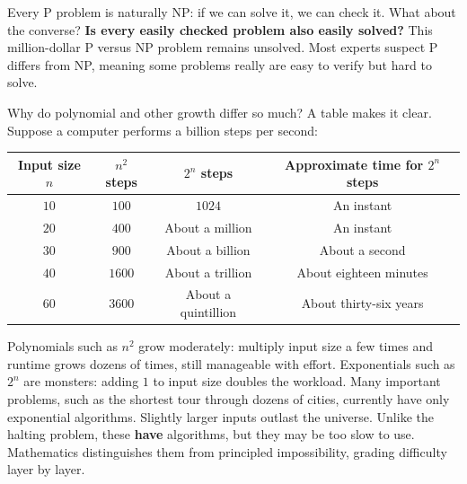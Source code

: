 Every P problem is naturally NP: if we can solve it, we can check it. What about the converse? \textbf{Is every easily checked problem also easily solved?} This million-dollar P versus NP problem remains unsolved. Most experts suspect P differs from NP, meaning some problems really are easy to verify but hard to solve.

Why do polynomial and other growth differ so much? A table makes it clear. Suppose a computer performs a billion steps per second:

\begin{center}
\begin{tabular}{cccc}
\toprule
Input size $n$ & $n^2$ steps & $2^n$ steps & Approximate time for $2^n$ steps \\
\midrule
$10$ & $100$ & $1024$ & An instant \\
$20$ & $400$ & About a million & An instant \\
$30$ & $900$ & About a billion & About a second \\
$40$ & $1600$ & About a trillion & About eighteen minutes \\
$60$ & $3600$ & About a quintillion & About thirty-six years \\
\bottomrule
\end{tabular}
\end{center}

Polynomials such as $n^2$ grow moderately: multiply input size a few times and runtime grows dozens of times, still manageable with effort. Exponentials such as $2^n$ are monsters: adding $1$ to input size doubles the workload. Many important problems, such as the shortest tour through dozens of cities, currently have only exponential algorithms. Slightly larger inputs outlast the universe. Unlike the halting problem, these \textbf{have} algorithms, but they may be too slow to use. Mathematics distinguishes them from principled impossibility, grading difficulty layer by layer.

\begin{center}
\end{center}

